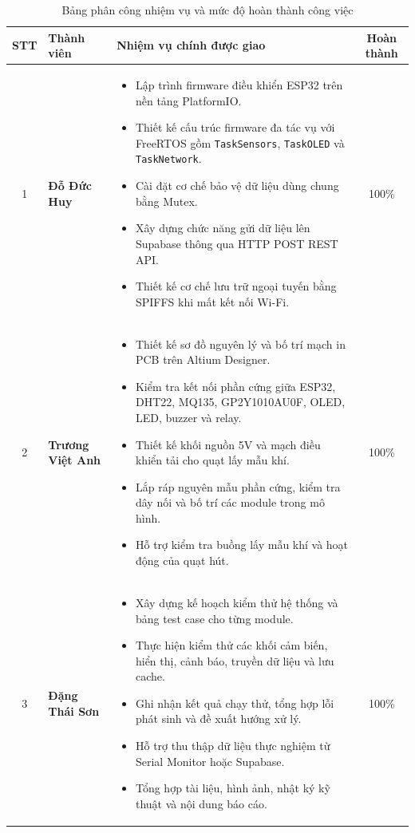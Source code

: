 \begin{table}[H]
\centering
\caption{Bảng phân công nhiệm vụ và mức độ hoàn thành công việc}
\label{tab:taskallocation}
\small
\renewcommand{\arraystretch}{1.35}
\setlength{\tabcolsep}{6pt}

\begin{tabularx}{\textwidth}{|c|p{3.2cm}|X|c|}
\hline
\textbf{STT} & \textbf{Thành viên} & \textbf{Nhiệm vụ chính được giao} & \textbf{Hoàn thành} \\
\hline

1 & \textbf{Đỗ Đức Huy} &
\begin{itemize}[leftmargin=*, nosep]
    \item Lập trình firmware điều khiển ESP32 trên nền tảng PlatformIO.
    \item Thiết kế cấu trúc firmware đa tác vụ với FreeRTOS gồm \texttt{TaskSensors}, \texttt{TaskOLED} và \texttt{TaskNetwork}.
    \item Cài đặt cơ chế bảo vệ dữ liệu dùng chung bằng Mutex.
    \item Xây dựng chức năng gửi dữ liệu lên Supabase thông qua HTTP POST REST API.
    \item Thiết kế cơ chế lưu trữ ngoại tuyến bằng SPIFFS khi mất kết nối Wi-Fi.
\end{itemize}
& 100\% \\
\hline

2 & \textbf{Trương Việt Anh} &
\begin{itemize}[leftmargin=*, nosep]
    \item Thiết kế sơ đồ nguyên lý và bố trí mạch in PCB trên Altium Designer.
    \item Kiểm tra kết nối phần cứng giữa ESP32, DHT22, MQ135, GP2Y1010AU0F, OLED, LED, buzzer và relay.
    \item Thiết kế khối nguồn 5V và mạch điều khiển tải cho quạt lấy mẫu khí.
    \item Lắp ráp nguyên mẫu phần cứng, kiểm tra dây nối và bố trí các module trong mô hình.
    \item Hỗ trợ kiểm tra buồng lấy mẫu khí và hoạt động của quạt hút.
\end{itemize}
& 100\% \\
\hline

3 & \textbf{Đặng Thái Sơn} &
\begin{itemize}[leftmargin=*, nosep]
    \item Xây dựng kế hoạch kiểm thử hệ thống và bảng test case cho từng module.
    \item Thực hiện kiểm thử các khối cảm biến, hiển thị, cảnh báo, truyền dữ liệu và lưu cache.
    \item Ghi nhận kết quả chạy thử, tổng hợp lỗi phát sinh và đề xuất hướng xử lý.
    \item Hỗ trợ thu thập dữ liệu thực nghiệm từ Serial Monitor hoặc Supabase.
    \item Tổng hợp tài liệu, hình ảnh, nhật ký kỹ thuật và nội dung báo cáo.
\end{itemize}
& 100\% \\
\hline

\end{tabularx}
\end{table}
